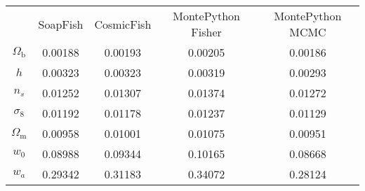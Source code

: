 \begin{table}
\centering
\begin{tabular}{|c|c|c|c|c|}
 & SoapFish & CosmicFish & MontePython Fisher & MontePython MCMC \\
$\Omega_\mathrm{b}$ & 0.00188 & 0.00193 & 0.00205 & 0.00186 \\
$h$ & 0.00323 & 0.00323 & 0.00319 & 0.00293 \\
$n_s$ & 0.01252 & 0.01307 & 0.01374 & 0.01272 \\
$\sigma_8$ & 0.01192 & 0.01178 & 0.01237 & 0.01129 \\
$\Omega_\mathrm{m}$ & 0.00958 & 0.01001 & 0.01075 & 0.00951 \\
$w_0$ & 0.08988 & 0.09344 & 0.10165 & 0.08668 \\
$w_a$ & 0.29342 & 0.31183 & 0.34072 & 0.28124 \\
\end{tabular}
\end{table}
